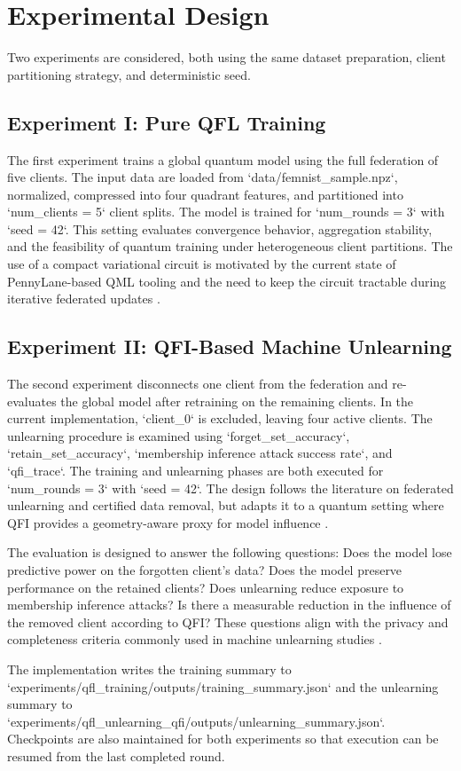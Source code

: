 \section{Experimental Design}
\label{sec:experiments}

Two experiments are considered, both using the same dataset preparation, client partitioning strategy, and deterministic seed.

\subsection{Experiment I: Pure QFL Training}

The first experiment trains a global quantum model using the full federation of five clients. The input data are loaded from `data/femnist_sample.npz`, normalized, compressed into four quadrant features, and partitioned into `num_clients = 5` client splits. The model is trained for `num_rounds = 3` with `seed = 42`. This setting evaluates convergence behavior, aggregation stability, and the feasibility of quantum training under heterogeneous client partitions. The use of a compact variational circuit is motivated by the current state of PennyLane-based QML tooling and the need to keep the circuit tractable during iterative federated updates \cite{pennylane,lightning2024,qfl_towards_2023}.

\subsection{Experiment II: QFI-Based Machine Unlearning}

The second experiment disconnects one client from the federation and re-evaluates the global model after retraining on the remaining clients. In the current implementation, `client_0` is excluded, leaving four active clients. The unlearning procedure is examined using `forget_set_accuracy`, `retain_set_accuracy`, `membership inference attack success rate`, and `qfi_trace`. The training and unlearning phases are both executed for `num_rounds = 3` with `seed = 42`. The design follows the literature on federated unlearning and certified data removal, but adapts it to a quantum setting where QFI provides a geometry-aware proxy for model influence \cite{unlearning_survey_2024,federated_unlearning_active_forgetting,forgettable_federated_linear_learning,qfi}.

The evaluation is designed to answer the following questions:
Does the model lose predictive power on the forgotten client's data? Does the model preserve performance on the retained clients? Does unlearning reduce exposure to membership inference attacks? Is there a measurable reduction in the influence of the removed client according to QFI? These questions align with the privacy and completeness criteria commonly used in machine unlearning studies \cite{mia,unlearning_survey_2024}.

The implementation writes the training summary to `experiments/qfl_training/outputs/training_summary.json` and the unlearning summary to `experiments/qfl_unlearning_qfi/outputs/unlearning_summary.json`. Checkpoints are also maintained for both experiments so that execution can be resumed from the last completed round.
